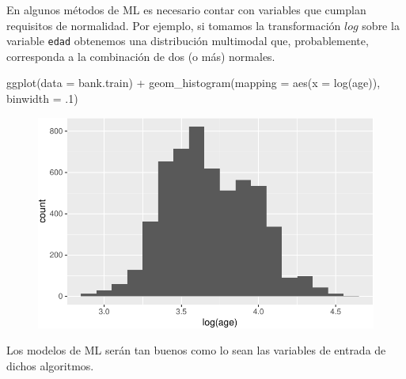 \documentclass[
  letterpaper,
  DIV=11,
  numbers=noendperiod]{scrreprt}
\newenvironment{Shaded}{\begin{snugshade}}{\end{snugshade}}
\newcommand{\AttributeTok}[1]{\textcolor[rgb]{0.40,0.45,0.13}{#1}}
\newcommand{\DecValTok}[1]{\textcolor[rgb]{0.68,0.00,0.00}{#1}}
\newcommand{\FunctionTok}[1]{\textcolor[rgb]{0.28,0.35,0.67}{#1}}
\newcommand{\NormalTok}[1]{\textcolor[rgb]{0.00,0.23,0.31}{#1}}
\newcommand{\SpecialCharTok}[1]{\textcolor[rgb]{0.37,0.37,0.37}{#1}}
\begin{document}
En algunos métodos de ML es necesario contar con variables que cumplan
requisitos de normalidad. Por ejemplo, si tomamos la transformación
\(log\) sobre la variable \texttt{edad} obtenemos una distribución
multimodal que, probablemente, corresponda a la combinación de dos (o
más) normales.

\begin{Shaded}
\begin{Highlighting}[]
\FunctionTok{ggplot}\NormalTok{(}\AttributeTok{data =}\NormalTok{ bank.train) }\SpecialCharTok{+}
  \FunctionTok{geom\_histogram}\NormalTok{(}\AttributeTok{mapping =} \FunctionTok{aes}\NormalTok{(}\AttributeTok{x =} \FunctionTok{log}\NormalTok{(age)), }\AttributeTok{binwidth =}\NormalTok{ .}\DecValTok{1}\NormalTok{)}
\end{Highlighting}
\end{Shaded}

\begin{figure}[H]

{\centering \includegraphics{eda_files/figure-pdf/unnamed-chunk-13-1.pdf}

}

\end{figure}

\begin{tcolorbox}[enhanced jigsaw, arc=.35mm, breakable, coltitle=black, left=2mm, opacityback=0, bottomtitle=1mm, colbacktitle=quarto-callout-important-color!10!white, title=\textcolor{quarto-callout-important-color}{\faExclamation}\hspace{0.5em}{Para recordar}, titlerule=0mm, colback=white, colframe=quarto-callout-important-color-frame, bottomrule=.15mm, rightrule=.15mm, opacitybacktitle=0.6, toptitle=1mm, toprule=.15mm, leftrule=.75mm]

Los modelos de ML serán tan buenos como lo sean las variables de entrada
de dichos algoritmos.

\end{tcolorbox}
\end{document}
